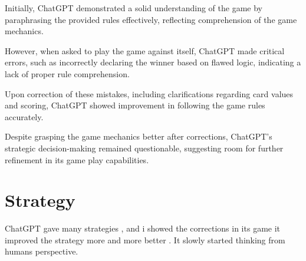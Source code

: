 \documentclass[a4paper]{article}
\begin{document}
Initially, ChatGPT demonstrated a solid understanding of the game by paraphrasing the provided rules effectively, reflecting comprehension of the game mechanics.


However, when asked to play the game against itself, ChatGPT made critical errors, such as incorrectly declaring the winner based on flawed logic, indicating a lack of proper rule comprehension.


Upon correction of these mistakes, including clarifications regarding card values and scoring, ChatGPT showed improvement in following the game rules accurately.


Despite grasping the game mechanics better after corrections, ChatGPT's strategic decision-making remained questionable, suggesting room for further refinement in its game play capabilities.

\section{Strategy}
ChatGPT gave many strategies , and i showed the corrections in its game it improved the strategy more and more better . It slowly started thinking from humans perspective.
\end{document}
